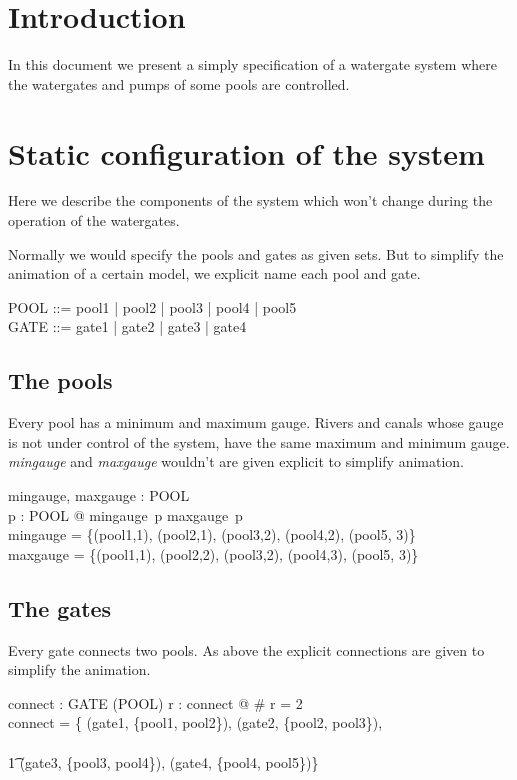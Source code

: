 \documentclass[a4paper]{article}
\begin{document}
\section{Introduction}
In this document we present a simply specification of a
watergate system where the watergates and pumps of some
pools are controlled.

\section{Static configuration of the system}
Here we describe the components of the system which won't change
during the operation of the watergates.

Normally we would specify the pools and gates as given sets. But
to simplify the animation of a certain model, we explicit name each pool
and gate.
\begin{zed}
  POOL ::= pool1 | pool2 | pool3 | pool4 | pool5\\
  GATE ::= gate1 | gate2 | gate3 | gate4
\end{zed}

\subsection{The pools}
Every pool has a minimum and maximum gauge. Rivers and canals
whose gauge is not under control of the system, have the same
maximum and minimum gauge. \emph{mingauge} and \emph{maxgauge}
wouldn't are given explicit to simplify animation.

\begin{axdef}
  mingauge, maxgauge : POOL \fun \nat\\
  \where
  \forall p : POOL @ mingauge~p \leq maxgauge~p\\
  mingauge = \{(pool1,1), (pool2,1), (pool3,2), (pool4,2), (pool5, 3)\}\\
  maxgauge = \{(pool1,1), (pool2,2), (pool3,2), (pool4,3), (pool5, 3)\}\\
\end{axdef}

\subsection{The gates}
Every gate connects two pools. As above the explicit connections are
given to simplify the animation.

\begin{axdef}
  connect : GATE \fun (\power POOL)
  \where
  \forall r : \ran connect @ \# r = 2\\
  connect = \{
  (gate1, \{pool1, pool2\}),
  (gate2, \{pool2, pool3\}),\\\\
  \t1 (gate3, \{pool3, pool4\}),
  (gate4, \{pool4, pool5\})\}
\end{axdef}
\end{document}
